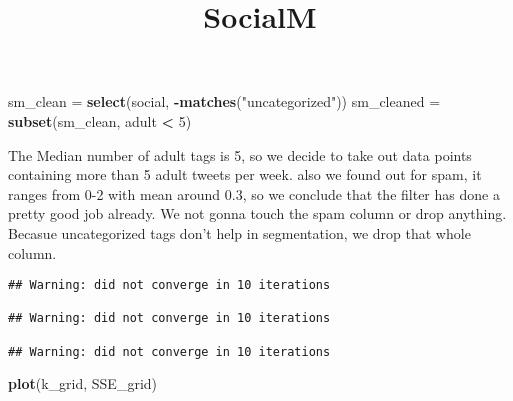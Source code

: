 \documentclass[]{article}
\title{SocialM}
\author{}
\date{}
\newenvironment{Shaded}{\begin{snugshade}}{\end{snugshade}}
\newcommand{\DataTypeTok}[1]{\textcolor[rgb]{0.13,0.29,0.53}{#1}}
\newcommand{\DecValTok}[1]{\textcolor[rgb]{0.00,0.00,0.81}{#1}}
\newcommand{\KeywordTok}[1]{\textcolor[rgb]{0.13,0.29,0.53}{\textbf{#1}}}
\newcommand{\NormalTok}[1]{#1}
\newcommand{\OperatorTok}[1]{\textcolor[rgb]{0.81,0.36,0.00}{\textbf{#1}}}
\newcommand{\StringTok}[1]{\textcolor[rgb]{0.31,0.60,0.02}{#1}}
\begin{document}
\maketitle

\begin{Shaded}
\begin{Highlighting}[]
\NormalTok{sm_clean =}\StringTok{ }\KeywordTok{select}\NormalTok{(social, }\OperatorTok{-}\KeywordTok{matches}\NormalTok{(}\StringTok{"uncategorized"}\NormalTok{))}
\NormalTok{sm_cleaned =}\StringTok{ }\KeywordTok{subset}\NormalTok{(sm_clean, adult }\OperatorTok{<}\StringTok{ }\DecValTok{5}\NormalTok{)}
\end{Highlighting}
\end{Shaded}

The Median number of adult tags is 5, so we decide to take out data
points containing more than 5 adult tweets per week. also we found out
for spam, it ranges from 0-2 with mean around 0.3, so we conclude that
the filter has done a pretty good job already. We not gonna touch the
spam column or drop anything. Becasue uncategorized tags don't help in
segmentation, we drop that whole column.

\begin{Shaded}
\end{Shaded}

\begin{verbatim}
## Warning: did not converge in 10 iterations

## Warning: did not converge in 10 iterations

## Warning: did not converge in 10 iterations
\end{verbatim}

\begin{Shaded}
\begin{Highlighting}[]
\KeywordTok{plot}\NormalTok{(k_grid, SSE_grid)}
\end{Highlighting}
\end{Shaded}
\end{document}
